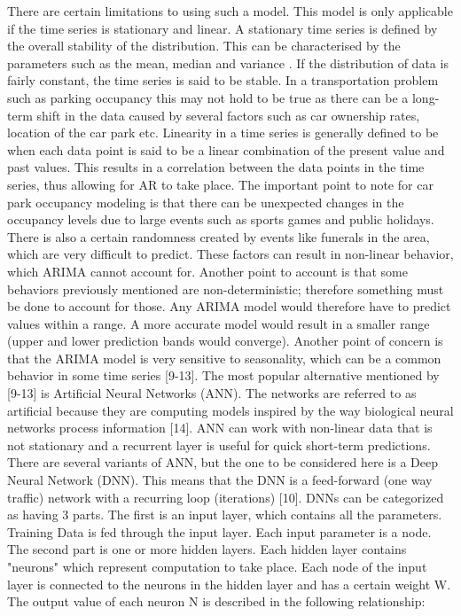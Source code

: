There are certain limitations to using such a model. This model is only applicable if the time series is stationary and linear. A stationary time series is defined by the overall stability of the distribution. This can be characterised by the parameters such as the mean, median and variance . If the distribution of data is fairly constant, the time series is said to be stable.  In a transportation problem such as parking occupancy this may not hold to be true as there can be a long-term shift in the data caused by several factors such as car ownership rates, location of the car park etc. Linearity in a time series is generally defined to be when each data point is said to be a linear combination of the present value and past values. This results in a correlation between the data points in the time series, thus allowing for AR to take place. The important point to note for car park occupancy modeling is that there can be unexpected changes in the occupancy levels due to large events such as sports games and public holidays. There is also a certain randomness created by events like funerals in the area, which are very difficult to predict. These factors can result in non-linear behavior, which ARIMA cannot account for. Another point to account is that some behaviors previously mentioned are non-deterministic; therefore something must be done to account for those. Any ARIMA model would therefore have to predict values within a range. A more accurate model would result in a smaller range (upper and lower prediction bands would converge). Another point of concern is that the ARIMA model is very sensitive to seasonality, which can be a common behavior in some time series [9-13]. The most popular alternative mentioned by  [9-13] is Artificial Neural Networks (ANN). The networks are referred to as artificial because they are computing models inspired by the way biological neural networks process information [14].  ANN can work with non-linear data that is not stationary and a recurrent layer is useful for quick short-term predictions. There are several variants of ANN, but the one to be considered here is a Deep Neural Network (DNN).  This means that the DNN is a feed-forward (one way traffic) network with a recurring loop (iterations) [10].  DNNs can be categorized as having 3 parts. The first is an input layer, which contains all the parameters. Training Data is fed through the input layer. Each input parameter is a node. The second part is one or more hidden layers. Each hidden layer contains "neurons" which represent computation to take place.  Each node of the input layer is connected to the neurons in the hidden layer and has a certain weight W. The output value of each neuron N is described in the following relationship:




